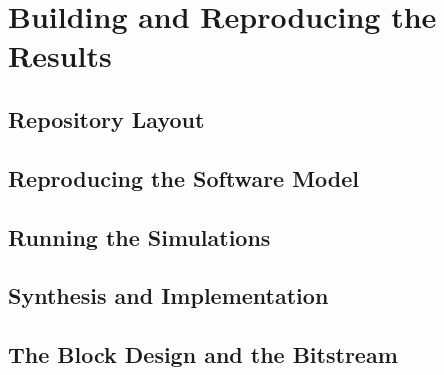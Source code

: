%
\chapter{Building and Reproducing the Results}
\label{ch:reproduction}

\section{Repository Layout}
\label{sec:repo-layout}

\section{Reproducing the Software Model}
\label{sec:repro-sw}

\section{Running the Simulations}
\label{sec:repro-sim}

\section{Synthesis and Implementation}
\label{sec:repro-impl}

\section{The Block Design and the Bitstream}
\label{sec:repro-bd}

